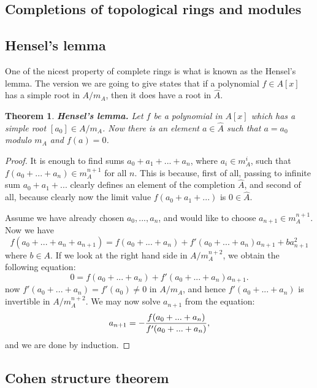 \documentclass[12pt,a4paper,leqno]{article}
\theoremstyle{plain}
\newtheorem{thm}[theo]{Theorem}
\theoremstyle{definition}
\theoremstyle{remark}
\begin{document}
\subsection{Completions of topological rings and modules}



\subsection{Hensel's lemma}

One of the nicest property of complete rings is what is known as the Hensel's lemma. The version we are going to give states that if a polynomial $f \in A[x]$ has a simple root in $A/m_A$, then it does have a root in $\hat A$.

\begin{thm} \textbf{Hensel's lemma.} Let $f$ be a polynomial in $A[x]$ which has a simple root $[a_0] \in A/m_A$. Now there is an element $a \in \hat A$ such that $a = a_0$ modulo $m_A$ and $f(a) = 0$.
\end{thm} 
\begin{proof}
It is enough to find sums $a_0 + a_1 + ... + a_n$, where $a_i \in m_A^i$, such that $f(a_0 + ... + a_n) \in m_A^{n+1}$ for all $n$. This is because, first of all, passing to infinite sum $a_0 + a_1 + ...$ clearly defines an element of the completion $\hat A$, and second of all, because clearly now the limit value $f(a_0 + a_1 + ...)$ is $0 \in \hat A$. 

Assume we have already chosen $a_0,...,a_n$, and would like to choose $a_{n+1} \in m_A^{n+1}$. Now we have
\begin{equation*}
f(a_0 + ... + a_n + a_{n+1}) = f(a_0 + ... + a_n) + f'(a_0 + ... + a_n)a_{n+1} + b a_{n+1}^2
\end{equation*}
where $b \in A$. If we look at the right hand side in $A/m_A^{n+2}$, we obtain the following equation:
\begin{equation*}
0 = f(a_0 + ... + a_n) + f'(a_0 + ... + a_n)a_{n+1}.
\end{equation*}
now $f'(a_0 + ... + a_n) = f'(a_0) \not = 0$ in $A/m_A$, and hence $f'(a_0 + ... + a_n)$ is invertible in $A/m_A^{n+2}$. We may now solve $a_{n+1}$ from the equation:
\begin{equation*}
a_{n+1} = - {f(a_0 + ... + a_n) \over f'(a_0 + ... + a_n)},
\end{equation*}
and we are done by induction.
\end{proof}

\subsection{Cohen structure theorem}
\end{document}
